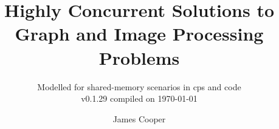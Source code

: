 \documentclass[newzealand,10pt,partial,onehalfspace]{aucklandthesis}
\theoremstyle{plain}
\begin{document}
\OnehalfSpacing
{}
\frontmatter

%
%
%

\title{Highly Concurrent Solutions to Graph and Image Processing Problems}
\subtitle{Modelled for shared-memory scenarios in \gls{cps} and code \\ {\small v0.1.29 compiled on \today}}
\author{James Cooper}

\maketitle





\cleardoublepage\tableofcontents
\cleardoublepage\listoffigures
\cleardoublepage\listoftables
\cleardoublepage\listofcprulesetfloats
\cleardoublepage\listofcpobjectsfloats
\cleardoublepage\listoffixmes
\cleardoublepage\printglossary
\cleardoublepage\printglossary[type=\acronymtype]


%
%
%
%
\end{document}
